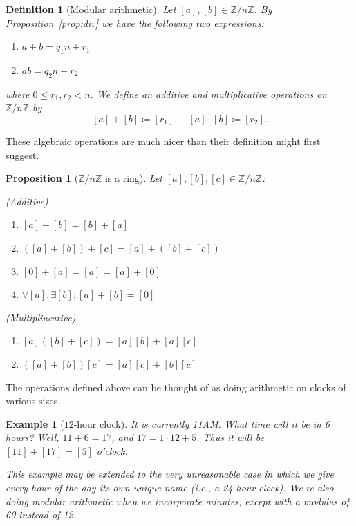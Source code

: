 \documentclass{article}
\newcommand{\blue}[1]{ {\color{blue}{#1}} }
\newcommand{\Z}{\mathbb{Z}}
\theoremstyle{plain}
\newtheorem{definition}{Definition}
\newtheorem{example}{Example}
\newtheorem{proposition}{Proposition}
\begin{document}
\begin{definition}[Modular arithmetic]
    Let $[a], [b] \in \Z/n\Z$.
    By Proposition~\ref{prop:div} we have the following two expressions:
    \begin{enumerate}
        \item $a+b = q_1 n + r_1$
        \item $ab = q_2 n + r_2$
    \end{enumerate}
    where $0\leq r_1,r_2 < n$.
    We define an additive and multiplicative operations on $\Z/n\Z$ by 
    \[  
        [a]+[b] \coloneq [r_1], \quad [a] \cdot [b] \coloneq [r_2].
    \]
\end{definition}

These algebraic operations are much nicer than their definition might first suggest.

\begin{proposition}[$\Z/n\Z$ is a ring]
    Let $[a],[b],[c] \in \Z/n\Z$:

    (Additive)
    \begin{enumerate}
        \item $[a]+[b] = [b]+[a]$
        \item $([a]+[b]) + [c] = [a] + ([b]+[c])$
        \item $[0]+[a] = [a] = [a]+[0]$
        \item $\forall [a], \exists [b]; [a]+[b] = [0]$
    \end{enumerate}

    (Multipliucative)
    \begin{enumerate}
        \item $[a]([b]+[c]) = [a][b] + [a][c]$
        \item $([a]+[b])[c] = [a][c] + [b][c]$
    \end{enumerate}
\end{proposition}

\blue{
\begin{proof}
    To do.
\end{proof}
}


The operations defined above can be thought of as doing arithmetic on clocks of various sizes.

\begin{example}[$12$-hour clock]
    It is currently 11AM. 
    What time will it be in 6 hours?
    Well, $11+6 = 17$, and $17 = 1\cdot12 + 5$.
    Thus it will be $[11]+[17] = [5]$ o'clock.\

    This example may be extended to the very unreasonable case in which we give 
    every hour of the day its own unique name (i.e., a 24-hour clock).
    We're also doing modular arithmetic when we incorporate minutes, 
    except with a modulus of 60 instead of 12.
\end{example}
\end{document}

